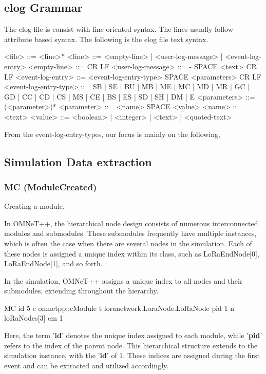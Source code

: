 \subsection{elog Grammar}
The elog file is consist with line-oriented syntax. The lines usually follow attribute based syntax. The following is the elog file text syntax. \cite{omnetppman}

\begin{rubycode}
<file> ::= <line>*
<line> ::= <empty-line> | <user-log-message> | <event-log-entry>
<empty-line> ::= CR LF
<user-log-message> ::= - SPACE <text> CR LF
<event-log-entry> ::= <event-log-entry-type> SPACE <parameters> CR LF
<event-log-entry-type> ::= SB | SE | BU | MB | ME | MC | MD | MR | GC | GD | CC | CD | CS | MS | CE | BS | ES | SD | SH | DM | E
<parameters> ::= (<parameter>)*
<parameter> ::= <name> SPACE <value>
<name> ::= <text>
<value> ::= <boolean> | <integer> | <text> | <quoted-text>
\end{rubycode}

From the event-log-entry-types, our focus is mainly on the following,

\subsection{Simulation Data extraction}
    \subsubsection{MC (ModuleCreated)} 
    Creating a module.

    In OMNeT++, the hierarchical node design consists of numerous interconnected modules and submodules. These submodules frequently have multiple instances, which is often the case when there are several nodes in the simulation. Each of these nodes is assigned a unique index within its class, such as LoRaEndNode[0], LoRaEndNode[1], and so forth.

    In the simulation, OMNeT++ assigns a unique index to all nodes and their submodules, extending throughout the hierarchy.

    \begin{rubycode}
        MC id 5 c omnetpp::cModule t loranetwork.LoraNode.LoRaNode pid 1 n loRaNodes[3] cm 1
    \end{rubycode}
    Here, the term '\textbf{id}' denotes the unique index assigned to each module, while '\textbf{pid}' refers to the index of the parent node. This hierarchical structure extends to the simulation instance, with the '\textbf{id}' of 1. These indices are assigned during the first event and can be extracted and utilized accordingly.

